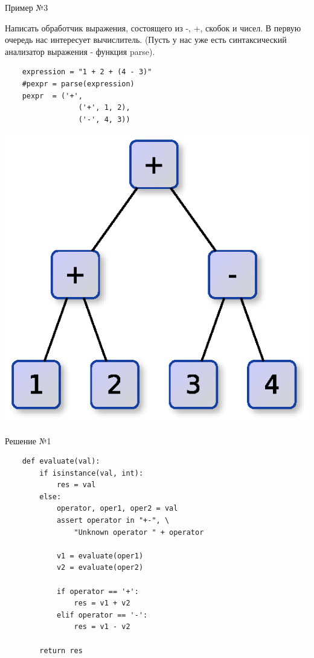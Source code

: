 \documentclass{article}
\begin{document}
\begin{center} Пример №3 \end{center}
    Написать обработчик выражения, состоящего из -, +, скобок и чисел.
    В первую очередь нас интересует вычислитель.
    (Пусть у нас уже есть синтаксический анализатор выражения - функция parse).
\begin{lstlisting}
    expression = "1 + 2 + (4 - 3)"
    #pexpr = parse(expression)
    pexpr  = ('+', 
                 ('+', 1, 2), 
                 ('-', 4, 3))
\end{lstlisting}
    \begin{center} \includegraphics{images/parse_tree.eps} \end{center}     
\newpage

\begin{center} Решение №1 \end{center}
\begin{lstlisting}
    def evaluate(val):
        if isinstance(val, int):
            res = val
        else:
            operator, oper1, oper2 = val
            assert operator in "+-", \
                "Unknown operator " + operator

            v1 = evaluate(oper1)
            v2 = evaluate(oper2)

            if operator == '+':
                res = v1 + v2
            elif operator == '-':
                res = v1 - v2

        return res
\end{lstlisting}
\newpage
\end{document}

